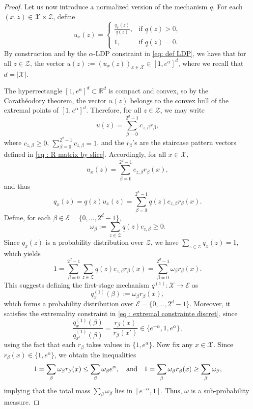 \documentclass[a4paper, 11pt]{article}
\theoremstyle{definition}
\newcommand{\cE}{{\mathcal{E}}}
\newcommand{\cX}{{\mathcal{X}}}
\newcommand{\cZ}{{\mathcal{Z}}}
\begin{document}
{\begin{proof}
Let us now introduce a normalized version of the mechanism $q$. For each $(x, z) \in \cX \times \cZ$, define
$$
u_x(z) = 
\begin{cases}
\displaystyle \frac{q_x(z)}{\underline{q}(z)}, & \text{if } \underline{q}(z) > 0, \\
1, & \text{if } \underline{q}(z) = 0.
\end{cases}
$$
By construction and by the $\alpha$-LDP constraint in \eqref{eq: def LDP}, we have that for all $z \in \cZ$, the vector $u(z) := (u_x(z))_{x \in \cX} \in [1, e^\alpha]^d$, where we recall that $d = |\cX|$.

The hyperrectangle $[1, e^\alpha]^d \subset \mathbb{R}^d$ is compact and convex, so by the Carathéodory theorem, the vector $u(z)$ belongs to the convex hull of the extremal points of $[1, e^\alpha]^d$. Therefore, for all $z \in \cZ$, we may write
$$
u(z) = \sum_{\beta=0}^{2^d - 1} c_{z, \beta} r_\beta,
$$
where $c_{z, \beta} \ge 0$, $\sum_{\beta=0}^{2^d - 1} c_{z, \beta} = 1$, and the $r_\beta$'s are the staircase pattern vectors defined in \eqref{eq : R matrix by slice}. Accordingly, for all $x \in \cX$,
$$
u_x(z) = \sum_{\beta=0}^{2^d - 1} c_{z, \beta} r_\beta(x),
$$
and thus
\begin{equation} \label{eq : qxz convex hull}
q_x(z) = \underline{q}(z) u_x(z) = \sum_{\beta=0}^{2^d - 1} \underline{q}(z) c_{z, \beta} r_\beta(x).
\end{equation}
Define, for each $\beta \in \mathcal{E} = \{0, \dots, 2^d - 1\}$,
\begin{equation} \label{eq: def omega beta 4.5}
\omega_\beta := \sum_{z \in \cZ} \underline{q}(z) c_{z, \beta} \ge 0.
\end{equation}
Since $q_x(z)$ is a probability distribution over $\cZ$, we have $\sum_{z \in \cZ} q_x(z) = 1$, which yields
\begin{equation} \label{eq: constraint factorisation 4.55}
1 = \sum_{\beta=0}^{2^d - 1} \sum_{z \in \cZ} \underline{q}(z) c_{z, \beta} r_\beta(x) = \sum_{\beta=0}^{2^d - 1} \omega_\beta r_\beta(x).
\end{equation}
This suggests defining the first-stage mechanism $q^{(1)} : \cX \to \cE$ as
\begin{equation} \label{eq: cond q1 4.6}
q^{(1)}_x(\beta) := \omega_\beta r_\beta(x),
\end{equation}
which forms a probability distribution over $\cE = \{0, \dots, 2^d - 1\}$. Moreover, it satisfies the extremality constraint in \eqref{eq : extremal constrainte discret}, since
$$
\frac{q^{(1)}_x(\beta)}{q^{(1)}_{x'}(\beta)} = \frac{r_\beta(x)}{r_\beta(x')} \in \{e^{-\alpha}, 1, e^\alpha\},
$$
using the fact that each $r_\beta$ takes values in $\{1, e^\alpha\}$.
Now fix any $x \in \cX$. Since $r_\beta(x) \in \{1, e^\alpha\}$, we obtain the inequalities
\begin{equation}{\label{eq: mass omega beta}}
 1 = \sum_{\beta} \omega_\beta r_\beta(x) \le \sum_\beta \omega_\beta e^\alpha, \quad \text{and} \quad 1 = \sum_\beta \omega_\beta r_\beta(x) \ge \sum_\beta \omega_\beta,   
\end{equation}
implying that the total mass $\sum_\beta \omega_\beta$ lies in $[e^{-\alpha}, 1]$. Thus, $\omega$ is a sub-probability measure.


\end{proof}}
\end{document}
